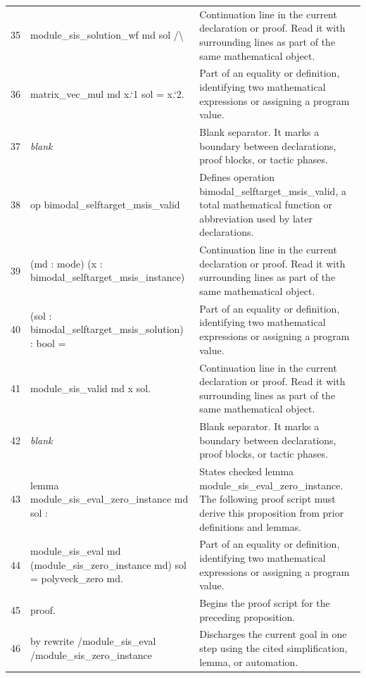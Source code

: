 \documentclass[10pt]{article}
\begin{document}
\begin{longtable}{r L{0.53\textwidth} L{0.37\textwidth}}
35 & {\ttfamily\scriptsize   module\_sis\_solution\_wf md sol /\textbackslash{}} & Continuation line in the current declaration or proof.  Read it with surrounding lines as part of the same mathematical object. \\
36 & {\ttfamily\scriptsize   matrix\_vec\_mul md x.`1 sol = x.`2.} & Part of an equality or definition, identifying two mathematical expressions or assigning a program value. \\
37 & {\ttfamily\scriptsize \emph{blank}} & Blank separator.  It marks a boundary between declarations, proof blocks, or tactic phases. \\
38 & {\ttfamily\scriptsize op bimodal\_selftarget\_msis\_valid} & Defines operation bimodal\_selftarget\_msis\_valid, a total mathematical function or abbreviation used by later declarations. \\
39 & {\ttfamily\scriptsize    (md : mode) (x : bimodal\_selftarget\_msis\_instance)} & Continuation line in the current declaration or proof.  Read it with surrounding lines as part of the same mathematical object. \\
40 & {\ttfamily\scriptsize    (sol : bimodal\_selftarget\_msis\_solution) : bool =} & Part of an equality or definition, identifying two mathematical expressions or assigning a program value. \\
41 & {\ttfamily\scriptsize   module\_sis\_valid md x sol.} & Continuation line in the current declaration or proof.  Read it with surrounding lines as part of the same mathematical object. \\
42 & {\ttfamily\scriptsize \emph{blank}} & Blank separator.  It marks a boundary between declarations, proof blocks, or tactic phases. \\
43 & {\ttfamily\scriptsize lemma module\_sis\_eval\_zero\_instance md sol :} & States checked lemma module\_sis\_eval\_zero\_instance.  The following proof script must derive this proposition from prior definitions and lemmas. \\
44 & {\ttfamily\scriptsize   module\_sis\_eval md (module\_sis\_zero\_instance md) sol = polyveck\_zero md.} & Part of an equality or definition, identifying two mathematical expressions or assigning a program value. \\
45 & {\ttfamily\scriptsize proof.} & Begins the proof script for the preceding proposition. \\
46 & {\ttfamily\scriptsize by rewrite /module\_sis\_eval /module\_sis\_zero\_instance} & Discharges the current goal in one step using the cited simplification, lemma, or automation. \\

\end{longtable}
\end{document}
